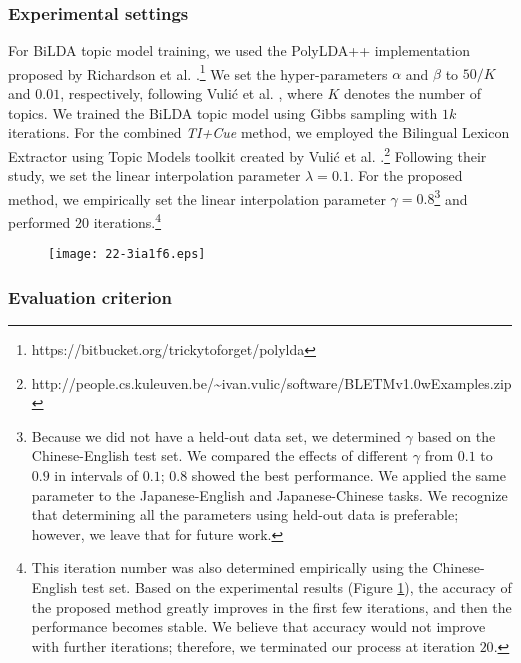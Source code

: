\documentclass[english]{jnlp_1.4}
\begin{document}
\subsubsection{Experimental settings}

For BiLDA topic model training, we used the PolyLDA++ implementation proposed by 
Richardson et
al. \citeyear{richardson-nakazawa-kurohashi:2013:IJCNLP}.\footnote{https://bitbucket.org/trickytoforget/polylda}
We set the hyper-parameters $\alpha$ and $\beta$ to $50/K$ and $0.01$, respectively, following
Vuli\'{c} et al. \citeyear{vulic-desmet-moens:2011:ACL-HLT2011}, where $K$ denotes the number
of topics. We trained the BiLDA topic model using Gibbs sampling with $1k$
iterations. For the combined {\it TI+Cue} method, 
we employed the Bilingual Lexicon Extractor using Topic Models toolkit created by
Vuli\'{c} et
al. \citeyear{vulic-desmet-moens:2011:ACL-HLT2011}.\footnote{http://people.cs.kuleuven.be/\~{}ivan.vulic/software/BLETMv1.0wExamples.zip}
Following their study, we set the linear interpolation parameter $\lambda = 0.1$.
For the proposed method, we empirically set the linear interpolation
parameter $\gamma = 0.8$\footnote{Because we did not have a held-out data set, we determined $\gamma$ 
  based on the Chinese-English test set. We compared the effects of different 
  $\gamma$ from $0.1$ to $0.9$ in intervals of $0.1$; $0.8$ showed the best 
  performance. We applied the same parameter to the Japanese-English and 
  Japanese-Chinese tasks. We recognize that determining all the parameters using held-out data 
  is preferable; however, we leave that for future work.} and performed $20$ iterations.\footnote{
  This iteration number was also determined empirically using the Chinese-English test set. Based 
  on the experimental results (Figure \ref{lexicon_fig:results}), the accuracy of the proposed method 
  greatly improves in the first few iterations, and then the performance becomes stable. We believe 
  that accuracy would not improve with further iterations; therefore, we terminated our process at iteration $20$.}

\begin{figure}[t]
\begin{center}
\texttt{[image: 22-3ia1f6.eps]}
\end{center}
\label{lexicon_fig:results}
\end{figure}


\subsubsection{Evaluation criterion}
\end{document}
